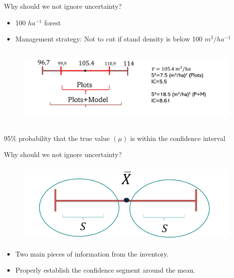 \documentclass{beamer}
\begin{document}
\begin{frame}{Why should we not ignore uncertainty?}
\begin{itemize}
    \item 100 $ha^{-1}$ forest 
    \item Management strategy: Not to cut if stand density is below 100 $m^3/ha^{-1}$
  \end{itemize}
\begin{figure}
        \centering
        \includegraphics[width = 12cm, height = 4cm]{pic/exemplo.jpg}
        \end{figure}

95$\%$ probability that the true 
value $(\mu )$ is within the confidence 
interval
\end{frame}

\begin{frame}{Why should we not ignore uncertainty?}
\begin{figure}
        \centering
        \includegraphics[width = 12cm, height = 4cm]{Imagem7.jpg.png}
        \end{figure}
\begin{itemize}
    \item Two main pieces of information from the inventory.
    \item Properly establish the confidence segment around the mean.
\end{itemize}
\end{frame}
\end{document}
